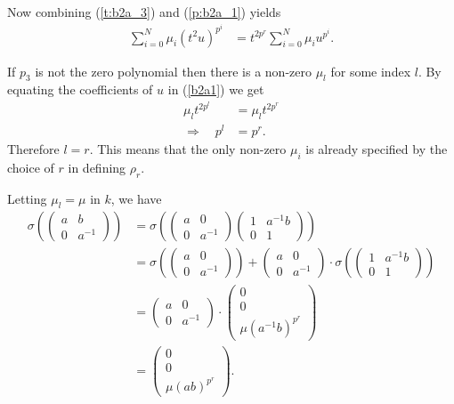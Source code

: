 Now combining (\ref{t:b2a_3}) and (\ref{p:b2a_1}) yields
\begin{align}
\label{b2a1}
\sum_{i=0}^N \mu_i (t^2u)^{p^i} &= t^{2p^r}\sum_{i=0}^N \mu_i u^{p^i}.
\end{align}

If $p_3$ is not the zero polynomial then there is a non-zero $\mu_l$ for some index $l$. By equating the coefficients of $u$ in (\ref{b2a1}) we get
\begin{align*}
\mu_lt^{2p^l} &= \mu_lt^{2p^r} \\
\Longrightarrow\quad p^l &= p^r.
\end{align*}
Therefore $l=r$. This means that the only non-zero $\mu_i$ is already specified by the choice of $r$ in defining $\rho_r$. 

Letting $\mu_l = \mu$ in $k$, we have
\begin{align*}
\sigma\left(
\left(\begin{matrix} a & b \\ 0 & a^{-1}\end{matrix}\right)
\right) &=
\sigma\left(
\left(\begin{matrix} a & 0 \\ 0 & a^{-1}\end{matrix}\right)
\left(\begin{matrix} 1 & a^{-1}b \\ 0 & 1\end{matrix}\right)
\right) \\
&=
\sigma\left(
\left(\begin{matrix} a & 0 \\ 0 & a^{-1}\end{matrix}\right)
\right) +
\left(\begin{matrix} a & 0 \\ 0 & a^{-1}\end{matrix}\right) \cdot
\sigma\left(
\left(\begin{matrix} 1 & a^{-1}b \\ 0 & 1\end{matrix}\right)
\right) \\
&=
\left(\begin{matrix} a & 0 \\ 0 & a^{-1}\end{matrix}\right) \cdot
\left(\begin{matrix} 0 \\ 0 \\ \mu(a^{-1}b)^{p^{r}}\end{matrix}\right) \\
&=
\left(\begin{matrix} 0 \\ 0 \\ \mu(ab)^{p^{r}}\end{matrix}\right).
\end{align*}


